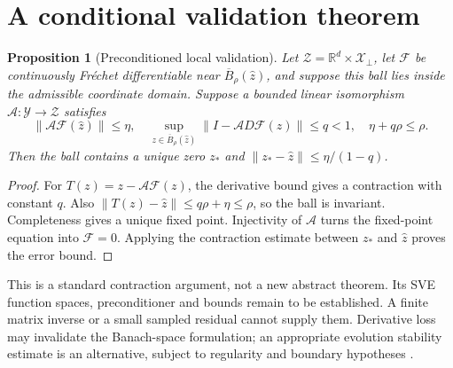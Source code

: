 \documentclass[12pt,a4paper,oneside]{report}
\numberwithin{equation}{chapter}
\newtheorem{proposition}[theorem]{Proposition}
\theoremstyle{remark}\newtheorem{remark}[theorem]{Remark}
\begin{document}
\section{A conditional validation theorem}
\begin{proposition}[Preconditioned local validation]\label{prop:rev8-validation}
Let $\mathcal Z=\mathbb R^d\times\mathcal X_\perp$, let $\mathcal F$ be continuously Fr\'echet differentiable near $\overline B_\rho(\widehat z)$, and suppose this ball lies inside the admissible coordinate domain. Suppose a bounded linear isomorphism $\mathcal A:\mathcal Y\to\mathcal Z$ satisfies
\[
 \|\mathcal A\mathcal F(\widehat z)\|\le\eta,\quad
 \sup_{z\in\overline B_\rho(\widehat z)}\|I-\mathcal A D\mathcal F(z)\|\le q<1,
 \quad \eta+q\rho\le\rho.
\]
Then the ball contains a unique zero $z_*$ and $\|z_*-\widehat z\|\le\eta/(1-q)$.
\end{proposition}
\begin{proof}
For $T(z)=z-\mathcal A\mathcal F(z)$, the derivative bound gives a contraction with constant $q$. Also $\|T(z)-\widehat z\|\le q\rho+\eta\le\rho$, so the ball is invariant. Completeness gives a unique fixed point. Injectivity of $\mathcal A$ turns the fixed-point equation into $\mathcal F=0$. Applying the contraction estimate between $z_*$ and $\widehat z$ proves the error bound.
\end{proof}
This is a standard contraction argument, not a new abstract theorem. Its SVE function spaces, preconditioner and bounds remain to be established. A finite matrix inverse or a small sampled residual cannot supply them. Derivative loss may invalidate the Banach-space formulation; an appropriate evolution stability estimate is an alternative, subject to regularity and boundary hypotheses \cite{mishra2023}.
\end{document}
